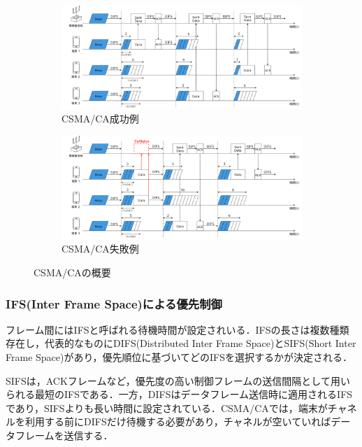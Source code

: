 \documentclass[a4paper, 10pt]{ltjsarticle}
\begin{document}
\begin{figure}[htbp]
  \centering

  \begin{subfigure}{\columnwidth}
    \centering
    \includegraphics[width=1\columnwidth]{./assets/csma-ca-s.png}
    \caption{CSMA/CA成功例}
    \label{1a}
  \end{subfigure}


  \begin{subfigure}{\columnwidth}
    \centering
    \includegraphics[width=1\columnwidth]{./assets/csma-ca-f.png}
    \caption{CSMA/CA失敗例}
    \label{1b}
  \end{subfigure}


  \caption{CSMA/CAの概要}
  \label{CSMA/CA}
\end{figure}

\subsubsection{IFS(Inter Frame Space)による優先制御}

フレーム間にはIFSと呼ばれる待機時間が設定されいる．IFSの長さは複数種類存在し，代表的なものにDIFS(Distributed Inter Frame Space)とSIFS(Short Inter Frame Space)があり，優先順位に基づいてどのIFSを選択するかが決定される．

SIFSは，ACKフレームなど，優先度の高い制御フレームの送信間隔として用いられる最短のIFSである．一方，DIFSはデータフレーム送信時に適用されるIFSであり，SIFSよりも長い時間に設定されている．CSMA/CAでは，端末がチャネルを利用する前にDIFSだけ待機する必要があり，チャネルが空いていればデータフレームを送信する．
\end{document}
